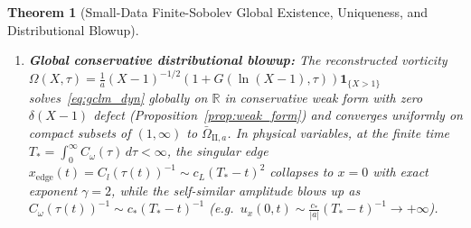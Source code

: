 \documentclass[11pt,a4paper]{article}
\newtheorem{thm}{Theorem}
\begin{document}
\begin{thm}[Small-Data Finite-Sobolev Global Existence, Uniqueness, and Distributional Blowup]
\begin{enumerate}
  \item \textbf{Global conservative distributional blowup:} The reconstructed vorticity $\Omega(X,\tau) = \frac{1}{a}(X-1)^{-1/2}(1+G(\ln(X-1),\tau))\mathbf{1}_{\{X>1\}}$ solves~\eqref{eq:gclm_dyn} globally on $\mathbb{R}$ in conservative weak form with zero $\delta(X-1)$ defect (Proposition~\ref{prop:weak_form}) and converges uniformly on compact subsets of $(1,\infty)$ to $\bar\Omega_{\mathrm{II},a}$. In physical variables, at the finite time $T_* = \int_0^\infty C_\omega(\tau)\,d\tau < \infty$, the singular edge $x_{\mathrm{edge}}(t) = C_l(\tau(t))^{-1} \sim c_L(T_*-t)^2$ collapses to $x = 0$ with exact exponent $\gamma = 2$, while the self-similar amplitude blows up as $C_\omega(\tau(t))^{-1} \sim c_*(T_*-t)^{-1}$ (e.g.\ $u_x(0,t) \sim \frac{c_*}{|a|}(T_*-t)^{-1} \to +\infty$).
\end{enumerate}
\end{thm}
\end{document}
